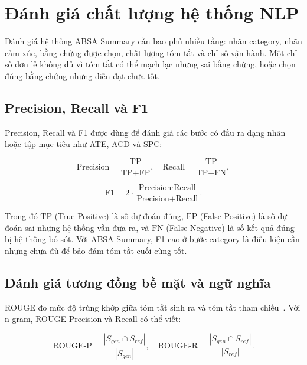 \section{Đánh giá chất lượng hệ thống NLP}
\label{sec:dev-chap2-nlp-evaluation}

Đánh giá hệ thống ABSA Summary cần bao phủ nhiều tầng: nhãn category, nhãn cảm xúc, bằng chứng được chọn, chất lượng tóm tắt và chỉ số vận hành. Một chỉ số đơn lẻ không đủ vì tóm tắt có thể mạch lạc nhưng sai bằng chứng, hoặc chọn đúng bằng chứng nhưng diễn đạt chưa tốt.

\subsection{Precision, Recall và F1}
\label{subsec:dev-chap2-prf1}

Precision, Recall và F1 được dùng để đánh giá các bước có đầu ra dạng nhãn hoặc tập mục tiêu như ATE, ACD và SPC:

\begin{equation}
\text{Precision}=\frac{\text{TP}}{\text{TP}+\text{FP}},\quad \text{Recall}=\frac{\text{TP}}{\text{TP}+\text{FN}},
\label{eq:chap2-pr}
\end{equation}

\begin{equation}
\text{F1}=2\cdot\frac{\text{Precision}\cdot \text{Recall}}{\text{Precision}+\text{Recall}}.
\label{eq:chap2-f1}
\end{equation}

Trong đó $\text{TP}$ (True Positive) là số dự đoán đúng, $\text{FP}$ (False Positive) là số dự đoán sai nhưng hệ thống vẫn đưa ra, và $\text{FN}$ (False Negative) là số kết quả đúng bị hệ thống bỏ sót. Với ABSA Summary, F1 cao ở bước category là điều kiện cần nhưng chưa đủ để bảo đảm tóm tắt cuối cùng tốt.

\subsection{Đánh giá tương đồng bề mặt và ngữ nghĩa}
\label{subsec:dev-chap2-rouge}

ROUGE đo mức độ trùng khớp giữa tóm tắt sinh ra và tóm tắt tham chiếu~\cite{lin2004rouge}. Với n-gram, ROUGE Precision và Recall có thể viết:

\begin{equation}
\text{ROUGE-P}=\frac{|S_{gen}\cap S_{ref}|}{|S_{gen}|}, \quad \text{ROUGE-R}=\frac{|S_{gen}\cap S_{ref}|}{|S_{ref}|}.
\label{eq:chap2-rouge-pr}
\end{equation}

